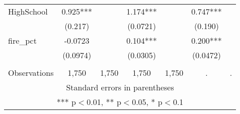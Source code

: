 \begin{tabular}{lcccccc}
HighSchool & 0.925*** &  & 1.174*** &  & 0.747*** &  \\
 & (0.217) &  & (0.0721) &  & (0.190) &  \\
fire\_pct & -0.0723 &  & 0.104*** &  & 0.200*** &  \\
 & (0.0974) &  & (0.0305) &  & (0.0472) &  \\
 &  &  &  &  &  &  \\
 Observations & 1,750 & 1,750 & 1,750 & 1,750 & . & . \\ \hline
\multicolumn{7}{c}{ Standard errors in parentheses} \\
\multicolumn{7}{c}{ *** p$<$0.01, ** p$<$0.05, * p$<$0.1} \\
\end{tabular}
